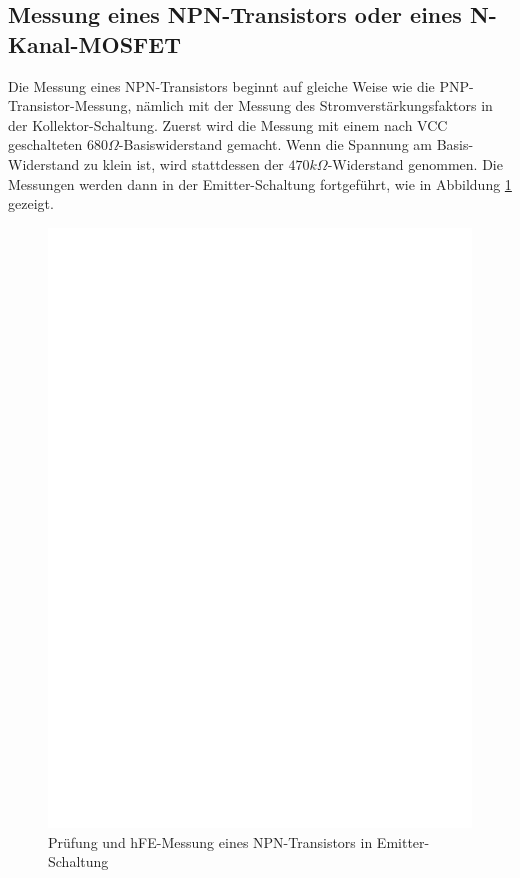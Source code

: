 \subsection{Messung eines NPN-Transistors oder eines N-Kanal-MOSFET}
Die Messung eines NPN-Transistors beginnt auf gleiche Weise wie die PNP-Transistor-Messung, nämlich
mit der Messung des Stromverst\"arkungsfaktors in der Kollektor-Schaltung.
Zuerst wird die Messung mit einem nach VCC geschalteten \(680\Omega\)-Basiswiderstand gemacht.
Wenn die Spannung am Basis-Widerstand zu klein ist, wird stattdessen der \(470k\Omega\)-Widerstand genommen.
Die Messungen werden dann in der Emitter-Schaltung fortgef\"uhrt, wie in Abbildung \ref{fig:npnce} gezeigt.
\begin{figure}[H]
\centering
\includegraphics[]{../FIG/NPNce.eps}
\caption{Pr\"ufung und hFE-Messung eines NPN-Transistors in Emitter-Schaltung}
\label{fig:npnce}
\end{figure}
